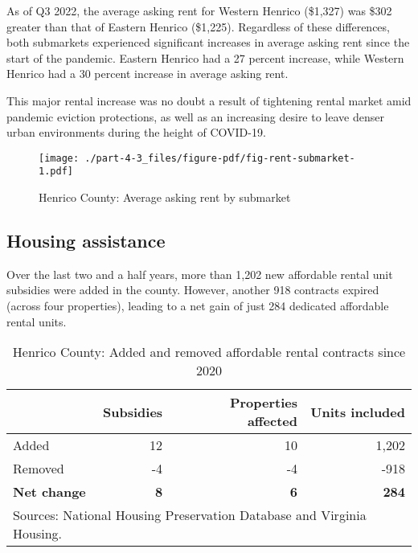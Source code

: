 \documentclass[
  letterpaper,
  DIV=11,
  numbers=noendperiod]{scrreprt}
\begin{document}
As of Q3 2022, the average asking rent for Western Henrico (\$1,327) was
\$302 greater than that of Eastern Henrico (\$1,225). Regardless of
these differences, both submarkets experienced significant increases in
average asking rent since the start of the pandemic. Eastern Henrico had
a 27 percent increase, while Western Henrico had a 30 percent increase
in average asking rent.

This major rental increase was no doubt a result of tightening rental
market amid pandemic eviction protections, as well as an increasing
desire to leave denser urban environments during the height of COVID-19.

\begin{figure}

{\centering \texttt{[image: ./part-4-3\_files/figure-pdf/fig-rent-submarket-1.pdf]}

}

\caption{\label{fig-rent-submarket}Henrico County: Average asking rent
by submarket}

\end{figure}

\hypertarget{housing-assistance-2}{%
\subsection{Housing assistance}\label{housing-assistance-2}}

Over the last two and a half years, more than 1,202 new affordable
rental unit subsidies were added in the county. However, another 918
contracts expired (across four properties), leading to a net gain of
just 284 dedicated affordable rental units.

\hypertarget{tbl-nhpd}{}
\begin{table}
\caption{\label{tbl-nhpd}Henrico County: Added and removed affordable rental contracts since 2020 }\tabularnewline

\centering
\begin{tabular}{l|r|r|r}
\hline
 & Subsidies & Properties affected & Units included\\
\hline
Added & 12 & 10 & 1,202\\
\hline
Removed & -4 & -4 & -918\\
\hline
\textbf{Net change} & \textbf{8} & \textbf{6} & \textbf{284}\\
\hline
\multicolumn{4}{l}{\rule{0pt}{1em}Sources: National Housing Preservation Database and Virginia Housing.}\\
\end{tabular}
\end{table}
\end{document}
